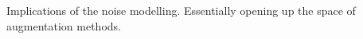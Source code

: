 

Implications of the noise modelling. Essentially opening up the space of augmentation methods. 


